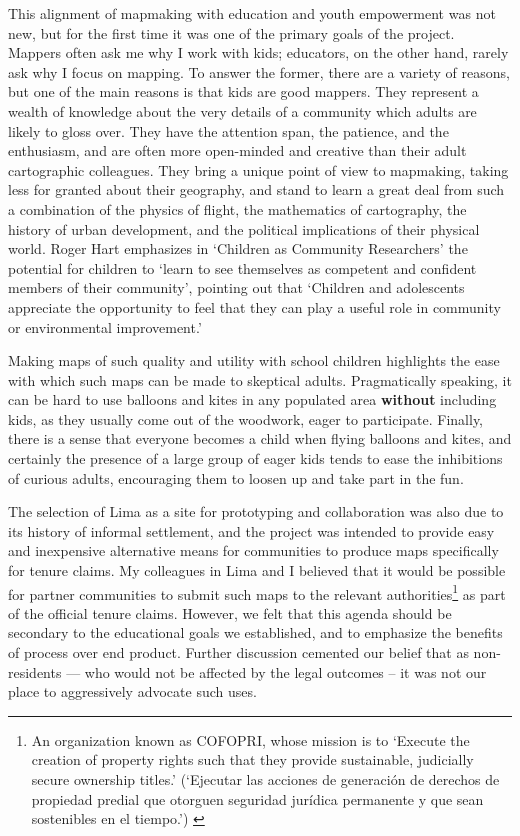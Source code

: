 \documentclass[11pt,oneside,notitlepage]{report}
\begin{document}
This alignment of mapmaking with education and youth empowerment was not new, but for the first time it was one of the primary goals of the project. Mappers often ask me why I work with kids; educators, on the other hand, rarely ask why I focus on mapping. To answer the former, there are a variety of reasons, but one of the main reasons is that kids are good mappers. They represent a wealth of knowledge about the very details of a community which adults are likely to gloss over. They have the attention span, the patience, and the enthusiasm, and are often more open-minded and creative than their adult cartographic colleagues. They bring a unique point of view to mapmaking, taking less for granted about their geography, and stand to learn a great deal from such a combination of the physics of flight, the mathematics of cartography, the history of urban development, and the political implications of their physical world. Roger Hart emphasizes in `Children as Community Researchers' the potential for children to `learn to see themselves as competent and confident members of their community', pointing out that `Children and adolescents appreciate the opportunity to feel that they can play a useful role in community or environmental improvement.' \cite{hart2001children}

Making maps of such quality and utility with school children highlights the ease with which such maps can be made to skeptical adults. Pragmatically speaking, it can be hard to use balloons and kites in any populated area \textbf{without} including kids, as they usually come out of the woodwork, eager to participate. Finally, there is a sense that everyone becomes a child when flying balloons and kites, and certainly the presence of a large group of eager kids tends to ease the inhibitions of curious adults, encouraging them to loosen up and take part in the fun. 

The selection of Lima as a site for prototyping and collaboration was also due to its history of informal settlement, and the project was intended to provide easy and inexpensive alternative means for communities to produce maps specifically for tenure claims. My colleagues in Lima and I believed that it would be possible for partner communities to submit such maps to the relevant authorities\footnote{An organization known as \ac{COFOPRI}, whose mission is to `Execute the creation of property rights such that they provide sustainable, judicially secure ownership titles.' (`Ejecutar las acciones de generación de derechos de propiedad predial que otorguen seguridad jurídica permanente y que sean sostenibles en el tiempo.') \cite{cofopri2010mision}} as part of the official tenure claims. However, we felt that this agenda should be secondary to the educational goals we established, and to emphasize the benefits of process over end product. Further discussion cemented our belief that as non-residents --- who would not be affected by the legal outcomes -- it was not our place to aggressively advocate such uses. 
\end{document}
